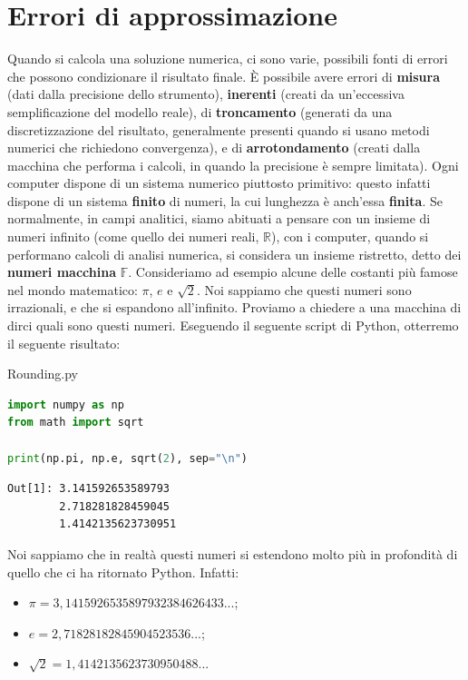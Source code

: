 \section{Errori di approssimazione}

Quando si calcola una soluzione numerica, ci sono varie, possibili fonti di errori che possono condizionare il risultato finale. È possibile avere errori di \textbf{misura} (dati dalla precisione dello strumento), \textbf{inerenti} (creati da un'eccessiva semplificazione del modello reale), di \textbf{troncamento} (generati da una discretizzazione del risultato, generalmente presenti quando si usano metodi numerici che richiedono convergenza), e di \textbf{arrotondamento} (creati dalla macchina che performa i calcoli, in quando la precisione è sempre limitata).
\nl
Ogni computer dispone di un sistema numerico piuttosto primitivo: questo infatti dispone di un sistema \textbf{finito} di numeri, la cui lunghezza è anch'essa \textbf{finita}. Se normalmente, in campi analitici, siamo abituati a pensare con un insieme di numeri infinito (come quello dei numeri reali, $\mathbb{R}$), con i computer, quando si performano calcoli di analisi numerica, si considera un insieme ristretto, detto dei \textbf{numeri macchina} $\mathbb{F}$. Consideriamo ad esempio alcune delle costanti più famose nel mondo matematico: $\pi$, $e$ e $\sqrt{2}$. Noi sappiamo che questi numeri sono irrazionali, e che si espandono all'infinito. Proviamo a chiedere a una macchina di dirci quali sono questi numeri. Eseguendo il seguente script di Python, otterremo il seguente risultato:

\begin{codeblock}{Rounding.py}
    \begin{lstlisting}[language = Python]
import numpy as np
from math import sqrt

print(np.pi, np.e, sqrt(2), sep="\n")\end{lstlisting}
    \vspace{11pt}
    \begin{tcolorbox}[colback = black!95!Periwinkle!90]
        \begin{lstlisting}[style = notexterm]
Out[1]: 3.141592653589793
        2.718281828459045
        1.4142135623730951\end{lstlisting}
    \end{tcolorbox}
\end{codeblock}

Noi sappiamo che in realtà questi numeri si estendono molto più in profondità di quello che ci ha ritornato Python. Infatti:
\begin{itemize}
    \item $\pi = 3,1415926535897932384626433...$;
    \item $e = 2,71828182845904523536...$;
    \item $\sqrt{2} = 1,4142135623730950488...$
\end{itemize}

